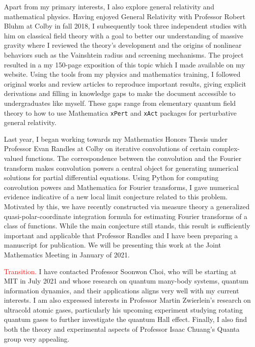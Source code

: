 \documentclass[12pt]{article}
\begin{document}
Apart from my primary interests, I also explore general relativity and mathematical physics. Having enjoyed General Relativity with Professor Robert Bluhm at Colby in fall 2018, I subsequently took three independent studies with him on classical field theory with a goal to better our understanding of massive gravity where I reviewed the theory's development and the origins of nonlinear behaviors such as the Vainshtein radius and screening mechanisms. The project resulted in a my 150-page exposition of this topic which I made available on my website. Using the tools from my physics and mathematics training, I followed original works and review articles to reproduce important results, giving explicit derivations and filling in knowledge gaps to make the document accessible to undergraduates like myself. These gaps range from elementary quantum field theory to how to use Mathematica \texttt{xPert} and \texttt{xAct} packages for perturbative general relativity. \\ \vspace{-10pt}

Last year, I began working towards my Mathematics Honors Thesis under Professor Evan Randles at Colby on iterative convolutions of certain complex-valued functions. The correspondence between the convolution and the Fourier transform makes convolution powers a central object for generating numerical solutions for partial differential equations. Using Python for computing convolution powers and Mathematica for Fourier transforms, I gave numerical evidence indicative of a new local limit conjecture related to this problem. Motivated by this, we have recently constructed via measure theory a generalized quasi-polar-coordinate integration formula for estimating Fourier transforms of a class of functions. While the main conjecture still stands, this result is sufficiently important and applicable that Professor Randles and I have been preparing a manuscript for publication. We will be presenting this work at the Joint Mathematics Meeting in January of 2021. \\ \vspace{-10pt}

\textcolor{red}{Transition.} I have contacted Professor Soonwon Choi, who will be starting at MIT in July 2021 and whose research on quantum many-body systems, quantum information dynamics, and their applications aligns very well with my current interests. I am also expressed interests in Professor Martin Zwierlein's research on ultracold atomic gases, particularly his upcoming experiment studying rotating quantum gases to further investigate the quantum Hall effect. Finally, I also find both the theory and experimental aspects of Professor Isaac Chuang's Quanta group very appealing.  \\ \vspace{-10pt}
\end{document}
